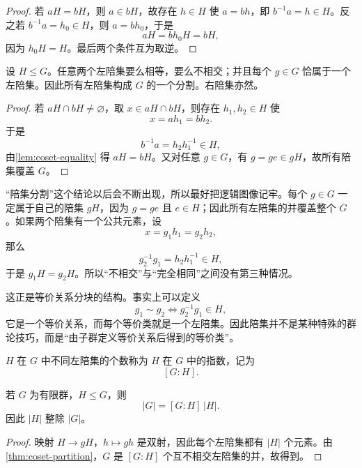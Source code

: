 \begin{proof}
若 $aH=bH$，则 $a\in bH$，故存在 $h\in H$ 使 $a=bh$，即 $b^{-1}a=h\in H$。反之若 $b^{-1}a=h_0\in H$，则 $a=bh_0$，于是
\[
aH=bh_0H=bH,
\]
因为 $h_0H=H$。最后两个条件互为取逆。
\end{proof}

\begin{theorem}[陪集分割定理]
设 $H\leqslant G$。任意两个左陪集要么相等，要么不相交；并且每个 $g\in G$ 恰属于一个左陪集。因此所有左陪集构成 $G$ 的一个分割。右陪集亦然。
\label{thm:coset-partition}

\end{theorem}

\begin{proof}
若 $aH\cap bH\neq\varnothing$，取 $x\in aH\cap bH$，则存在 $h_1,h_2\in H$ 使
\[
x=ah_1=bh_2.
\]
于是
\[
b^{-1}a=h_2h_1^{-1}\in H,
\]
由\cref{lem:coset-equality} 得 $aH=bH$。又对任意 $g\in G$，有 $g=ge\in gH$，故所有陪集覆盖 $G$。
\end{proof}

“陪集分割”这个结论以后会不断出现，所以最好把逻辑图像记牢。每个 $g\in G$ 一定属于自己的陪集 $gH$，因为 $g=ge$ 且 $e\in H$；因此所有左陪集的并覆盖整个 $G$。如果两个陪集有一个公共元素，设
\[
x=g_1h_1=g_2h_2,
\]
那么
\[
g_2^{-1}g_1=h_2h_1^{-1}\in H,
\]
于是 $g_1H=g_2H$。所以“不相交”与“完全相同”之间没有第三种情况。

这正是等价关系分块的结构。事实上可以定义
\[
g_1\sim g_2\iff g_2^{-1}g_1\in H,
\]
它是一个等价关系，而每个等价类就是一个左陪集。因此陪集并不是某种特殊的群论技巧，而是“由子群定义等价关系后得到的等价类”。


\begin{definition}[指数]
$H$ 在 $G$ 中不同左陪集的个数称为 $H$ 在 $G$ 中的指数，记为
\[
[G:H].
\]
\label{def:index}
\end{definition}

\begin{theorem}[Lagrange 定理]
若 $G$ 为有限群，$H\leqslant G$，则
\[
\lvert G\rvert=[G:H]\,\lvert H\rvert.
\label{eq:lagrange}
\]
因此 $\lvert H\rvert$ 整除 $\lvert G\rvert$。
\label{thm:lagrange}

\end{theorem}

\begin{proof}
映射 $H\to gH$，$h\mapsto gh$ 是双射，因此每个左陪集都有 $\lvert H\rvert$ 个元素。由\cref{thm:coset-partition}，$G$ 是 $[G:H]$ 个互不相交左陪集的并，故得到。
\end{proof}

